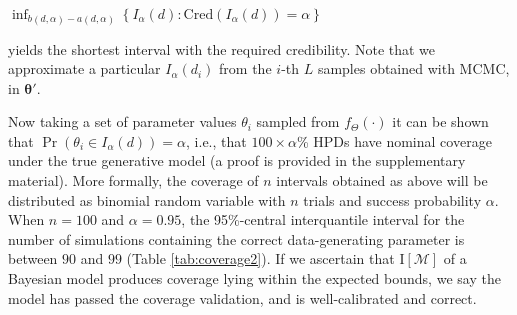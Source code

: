 \documentclass[oneside]{article}
\begin{document}
\begin{center}
  \hspace{0cm}
  $\inf_{b(d, \alpha)-a(d, \alpha)} \left \{ I_\alpha(d) : \text{Cred}(I_\alpha(d)) = \alpha \right\}$
\end{center}

\noindent yields the shortest interval with the required credibility.
Note that we approximate a particular $I_\alpha(d_i)$ from the $i$-th $L$ samples obtained with MCMC, in $\boldsymbol{\theta}'$.

Now taking a set of parameter values $\theta_i$ sampled from $f_\Theta(\cdot)$
it can be shown that
$\operatorname{Pr}\left(\theta_i \in I_\alpha(d) \right) = \alpha$, i.e., that $100\times\alpha$\% HPDs have nominal coverage under the true generative model (a proof is provided in the supplementary material).
More formally, the coverage of $n$ intervals obtained as above will be distributed as binomial random variable with $n$ trials and success probability $\alpha$.
When $n=100$ and $\alpha = 0.95$, the 95\%-central interquantile interval for the number of simulations containing the correct data-generating parameter is between $90$ and $99$ (Table \ref{tab:coverage2}).
If we ascertain that $\text{I}[\mathcal{M}]$ of a Bayesian model produces coverage lying within the expected bounds, we say the model has passed the coverage validation, and is well-calibrated and correct.
\end{document}
